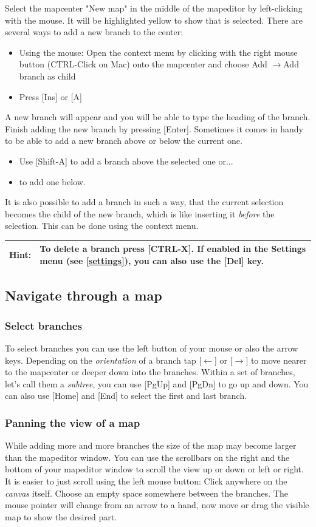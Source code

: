 \documentclass[12pt,a4paper]{article}
\newcommand{\hint}[1]{
    \begin{center} 
        \begin{tabular}{|rp{12cm}|} \hline
            {\bf Hint}:& #1\\   \hline
        \end{tabular}
            \marginpar{\Huge !} 
    \end{center} 
}
\newcommand{\ra}{$\longrightarrow$}
\newcommand{\la}{$\longleftarrow$}
\newcommand{\key}[1]{[#1]}
\begin{document}
Select the mapcenter "New map" in the middle of the mapeditor by
left-clicking with the mouse. It will be highlighted yellow to show that is
selected. There are several ways to add a new branch to the center:
\begin{itemize}
    \item Using the mouse: Open the context menu by clicking with the
    right mouse button (CTRL-Click on Mac) onto the
    mapcenter and choose Add \ra Add branch as child
    \item Press \key{Ins} or \key{A}
\end{itemize}
A new branch will appear and you will be able to type the heading of the
branch. Finish adding the new branch by pressing \key{Enter}.
Sometimes it comes in handy to be able to add a new branch above or below the current
one. 
\begin{itemize}
    \item Use \key{Shift-A} to add a branch above the selected one or... 
    \item \key{Ctrl-A} to add one below. 
\end{itemize}
It is also
possible to add a branch in such a way, that the current selection
becomes the child of the new branch, which is like inserting it {\em
before} the selection. This can be done using the context menu.

\hint{To delete a branch press \key{CTRL-X}. If enabled in the Settings
menu (see \ref{settings}), you can also use the \key{Del} key.}

\subsection{Navigate through a map}
\subsubsection*{Select branches}
To select branches you can use the left button of your mouse or also the
arrow keys. Depending on the {\em orientation} of a branch tap
\key{\la} or \key{\ra} to move nearer to the mapcenter or deeper
down into the branches. Within a set of branches, let's call them a 
{\em subtree}, you can use \key{PgUp} and \key{PgDn} to go up and down. You can
also use \key{Home} and \key{End} to select the first and last branch.


\subsubsection*{Panning the view of a map}
While adding more and more branches the size of the map may become
larger than the mapeditor window. You can use the scrollbars on the
right and the bottom of your mapeditor window to scroll the view up or down or left or right. It is easier to just scroll using the left mouse button: Click anywhere on the {\em canvas} itself. Choose an empty space somewhere between the branches. The
mouse pointer will change from an arrow to a hand, now move or drag the visible
map to show the desired part.
\end{document}
